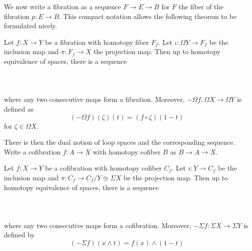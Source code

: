 \documentclass[a4paper]{article}
\begin{document}
We now write a fibration as a sequence $F\to E\to B$ for $F$ the fiber of the fibration $p:E\to B$. This compact notation allows the following theorem to be formulated nicely. 

\begin{thm}{}{} Let $f:X\to Y$ be a fibration with homotopy fiber $F_f$. Let $\iota:\Omega Y\to F_f$ be the inclusion map and $\pi:F_f\to X$ the projection map. Then up to homotopy equivalence of spaces, there is a sequence \\~\\
\\~\\
where any two consecutive maps form a fibration. Moreover, $-\Omega f:\Omega X\to\Omega Y$ is defined as $$(-\Omega f)(\zeta)(t)=(f\circ\zeta)(1-t)$$ for $\zeta\in\Omega X$. 
\end{thm}

There is then the dual notion of loop spaces and the corresponding sequence. Write a cofibration $f:A\to X$ with homotopy cofiber $B$ as $B\to A\to X$. 

\begin{thm}{}{} Let $f:X\to Y$ be a cofibration with homotopy cofiber $C_f$. Let $i:Y\to C_f$ be the inclusion map and $\pi:C_f\to C_f/Y\cong\Sigma X$ be the projection map. Then up to homotopy equivalence of spaces, there is a sequence \\~\\
\\~\\
where any two consecutive maps form a cofibration. Moreover, $-\Sigma f:\Sigma X\to\Sigma Y$ is defined by $$(-\Sigma f)(x\wedge t)=f(x)\wedge(1-t)$$
\end{thm}
\end{document}
